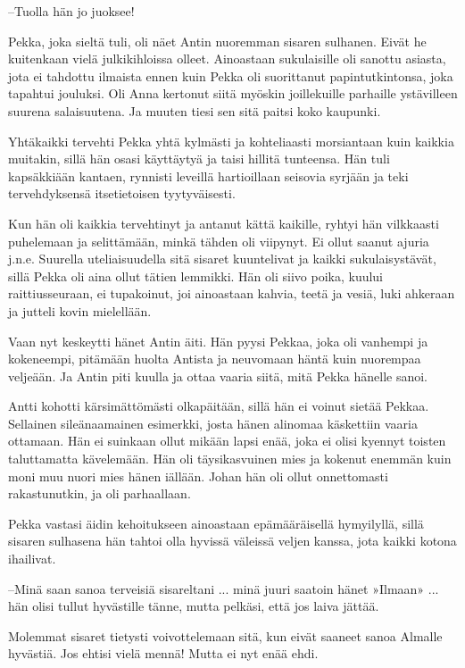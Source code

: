 \documentclass[a4paper,finnish,12pt]{scrartcl}
\begin{document}
--Tuolla hän jo juoksee!

Pekka, joka sieltä tuli, oli näet Antin nuoremman sisaren sulhanen.
Eivät he kuitenkaan vielä julkikihloissa olleet. Ainoastaan
sukulaisille oli sanottu asiasta, jota ei tahdottu ilmaista ennen kuin
Pekka oli suorittanut papintutkintonsa, joka tapahtui jouluksi. Oli
Anna kertonut siitä myöskin joillekuille parhaille ystävilleen suurena
salaisuutena. Ja muuten tiesi sen sitä paitsi koko kaupunki.

Yhtäkaikki tervehti Pekka yhtä kylmästi ja kohteliaasti morsiantaan
kuin kaikkia muitakin, sillä hän osasi käyttäytyä ja taisi hillitä
tunteensa. Hän tuli kapsäkkiään kantaen, rynnisti leveillä hartioillaan
seisovia syrjään ja teki tervehdyksensä itsetietoisen tyytyväisesti.

Kun hän oli kaikkia tervehtinyt ja antanut kättä kaikille, ryhtyi hän
vilkkaasti puhelemaan ja selittämään, minkä tähden oli viipynyt. Ei
ollut saanut ajuria j.n.e. Suurella uteliaisuudella sitä sisaret
kuuntelivat ja kaikki sukulaisystävät, sillä Pekka oli aina ollut
tätien lemmikki. Hän oli siivo poika, kuului raittiusseuraan, ei
tupakoinut, joi ainoastaan kahvia, teetä ja vesiä, luki ahkeraan ja
jutteli kovin mielellään.

Vaan nyt keskeytti hänet Antin äiti. Hän pyysi Pekkaa, joka oli
vanhempi ja kokeneempi, pitämään huolta Antista ja neuvomaan häntä kuin
nuorempaa veljeään. Ja Antin piti kuulla ja ottaa vaaria siitä, mitä
Pekka hänelle sanoi.

Antti kohotti kärsimättömästi olkapäitään, sillä hän ei voinut sietää
Pekkaa. Sellainen sileänaamainen esimerkki, josta hänen alinomaa
käskettiin vaaria ottamaan. Hän ei suinkaan ollut mikään lapsi enää,
joka ei olisi kyennyt toisten taluttamatta kävelemään. Hän oli
täysikasvuinen mies ja kokenut enemmän kuin moni muu nuori mies hänen
iällään. Johan hän oli ollut onnettomasti rakastunutkin, ja oli
parhaallaan.

Pekka vastasi äidin kehoitukseen ainoastaan epämääräisellä hymyilyllä,
sillä sisaren sulhasena hän tahtoi olla hyvissä väleissä veljen kanssa,
jota kaikki kotona ihailivat.

--Minä saan sanoa terveisiä sisareltani ... minä juuri saatoin hänet
»Ilmaan» ... hän olisi tullut hyvästille tänne, mutta pelkäsi, että jos
laiva jättää.

Molemmat sisaret tietysti voivottelemaan sitä, kun eivät saaneet sanoa
Almalle hyvästiä. Jos ehtisi vielä mennä! Mutta ei nyt enää ehdi.
\end{document}
